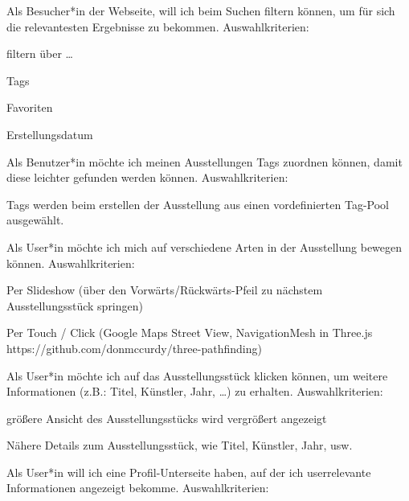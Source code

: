 \begin{compactenum}
\begin{compactitem}
    \end{compactitem} 
    \item  Als Besucher*in der Webseite, will ich beim Suchen filtern können, um für sich die relevantesten Ergebnisse zu bekommen. Auswahlkriterien: 
    \begin{compactitem}
        \item filtern über …
        \begin{compactitem}
            \item Tags
            \item Favoriten
            \item Erstellungsdatum
        \end{compactitem}
    \end{compactitem} 
    \item Als Benutzer*in möchte ich meinen Ausstellungen Tags zuordnen können, damit diese leichter gefunden werden können. Auswahlkriterien: 
    \begin{compactitem}
        \item Tags werden beim erstellen der Ausstellung aus einen vordefinierten Tag-Pool ausgewählt.
    \end{compactitem} 
    \item Als User*in möchte ich mich auf verschiedene Arten in der Ausstellung bewegen können. Auswahlkriterien: 
    \begin{compactitem}
        \item Per Slideshow (über den Vorwärts/Rückwärts-Pfeil zu nächstem Ausstellungsstück springen)
        \item Per Touch / Click (Google Maps Street View, NavigationMesh in Three.js https://github.com/donmccurdy/three-pathfinding)
    \end{compactitem} 
    \item  Als User*in möchte ich auf das Ausstellungsstück klicken können, um weitere Informationen (z.B.: Titel, Künstler, Jahr, …) zu erhalten. Auswahlkriterien: 
    \begin{compactitem}
        \item größere Ansicht des Ausstellungsstücks wird vergrößert angezeigt
        \item Nähere Details zum Ausstellungsstück, wie Titel, Künstler, Jahr, usw.
    \end{compactitem} 
    \item  Als User*in will ich eine Profil-Unterseite haben, auf der ich userrelevante Informationen angezeigt bekomme. Auswahlkriterien: 
    \begin{compactitem}

\end{compactitem}
\end{compactenum}
